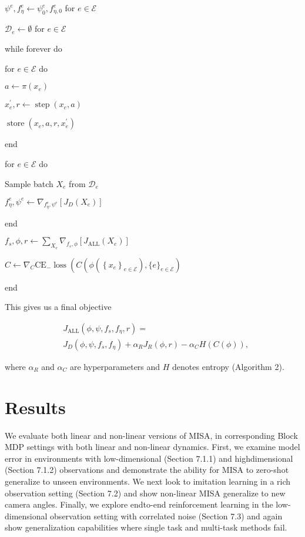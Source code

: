 \documentclass[10pt]{article}
\begin{document}
$\psi^{e}, f_{\eta}^{e} \leftarrow \psi_{0}^{e}, f_{\eta, 0}^{e}$ for $e \in \mathcal{E}$

$\mathcal{D}_{e} \leftarrow \emptyset$ for $e \in \mathcal{E}$

while forever do

for $e \in \mathcal{E}$ do

$a \leftarrow \pi\left(x_{e}\right)$

$x_{e}^{\prime}, r \leftarrow \operatorname{step}\left(x_{e}, a\right)$

$\operatorname{store}\left(x_{e}, a, r, x_{e}^{\prime}\right)$

end

for $e \in \mathcal{E}$ do

Sample batch $X_{e}$ from $\mathcal{D}_{e}$

$f_{\eta}^{e}, \psi^{e} \leftarrow \nabla_{f_{\eta}^{e}, \psi^{e}}\left[J_{D}\left(X_{e}\right)\right]$

end

$f_{s}, \phi, r \leftarrow \sum_{X_{e}} \nabla_{f_{s}, \phi}\left[J_{\mathrm{ALL}}\left(X_{e}\right)\right]$

$C \leftarrow \nabla_{C} \mathrm{CE}_{-} \operatorname{loss}\left(C\left(\phi\left(\left\{x_{e}\right\}_{e \in \mathcal{E}}\right),\{e\}_{e \in \mathcal{E}}\right)\right.$

end

This gives us a final objective

\[
\begin{aligned}
& J_{\mathrm{ALL}}\left(\phi, \psi, f_{s}, f_{\eta}, r\right)= \\
& J_{D}\left(\phi, \psi, f_{s}, f_{\eta}\right)+\alpha_{R} J_{R}(\phi, r)-\alpha_{C} H(C(\phi)),
\end{aligned}
\]

where $\alpha_{R}$ and $\alpha_{C}$ are hyperparameters and $H$ denotes entropy (Algorithm 2).

\section{Results}
We evaluate both linear and non-linear versions of MISA, in corresponding Block MDP settings with both linear and non-linear dynamics. First, we examine model error in environments with low-dimensional (Section 7.1.1) and highdimensional (Section 7.1.2) observations and demonstrate the ability for MISA to zero-shot generalize to unseen environments. We next look to imitation learning in a rich observation setting (Section 7.2) and show non-linear MISA generalize to new camera angles. Finally, we explore endto-end reinforcement learning in the low-dimensional observation setting with correlated noise (Section 7.3) and again show generalization capabilities where single task and multi-task methods fail.
\end{document}
